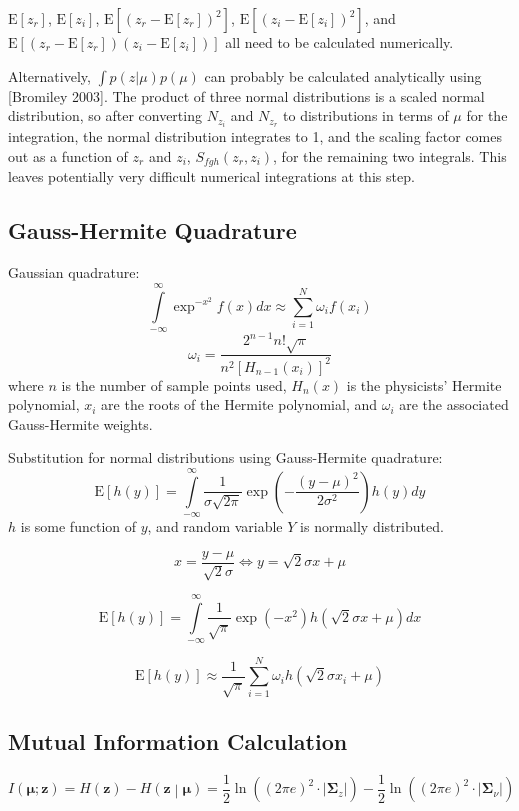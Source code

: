 \documentclass{article}         %
\theoremstyle{definition}
\theoremstyle{remark}
\newcommand{\eq}[1]{\begin{equation} #1 \end{equation}}
\newcommand{\zbf}{\mathbf{z}}
\newcommand{\mubf}{\boldsymbol{\mu}}
\newcommand{\Sigmabf}{\boldsymbol{\Sigma}}
\newcommand{\paren}[1]{\left(#1\right)}
\newcommand{\bracket}[1]{\left[#1\right]}
\newcommand{\expect}[1]{\mathrm{E}\left[#1\right]}
\newcommand{\intinfty}{\int\limits_{-\infty}^\infty}
\newcommand{\sumin}{\sum\limits_{i=1}^N}
\begin{document}
$\expect{z_r}$, $\expect{z_i}$, $\expect{\left(z_r - \expect{z_r}\right)^2}$, $\expect{\left(z_i - \expect{z_i}\right)^2}$, and $\expect{\left(z_r - \expect{z_r}\right)\left(z_i - \expect{z_i}\right)}$ all need to be calculated numerically.
 
Alternatively, $\int p(z|\mu)p(\mu)$ can probably be calculated analytically using [Bromiley 2003]. The product of three normal distributions is a scaled normal distribution, so after converting $N_{z_i}$ and $N_{z_r}$ to distributions in terms of $\mu$ for the integration, the normal distribution integrates to 1, and the scaling factor comes out as a function of $z_r$ and $z_i$, $S_{fgh}\paren{z_r,z_i}$, for the remaining two integrals. This leaves potentially very difficult numerical integrations at this step.

\subsection{Gauss-Hermite Quadrature}

Gaussian quadrature:
\eq{\intinfty\exp^{-x^2}f\paren{x}dx \approx \sumin\omega_if\paren{x_i}}
\eq{\omega_i = \frac{2^{n-1}n!\sqrt{\pi}}{n^2\bracket{H_{n-1}\paren{x_i}}^2}}
where $n$ is the number of sample points used, $H_n\paren{x}$ is the physicists' Hermite polynomial, $x_i$ are the roots of the Hermite polynomial, and $\omega_i$ are the associated Gauss-Hermite weights.

Substitution for normal distributions using Gauss-Hermite quadrature:
\eq{\expect{h\paren{y}} = \intinfty\frac{1}{\sigma\sqrt{2\pi}}\exp\paren{-\frac{\paren{y-\mu}^2}{2\sigma^2}}h\paren{y}dy}
$h$ is some function of $y$, and random variable $Y$ is normally distributed.

\eq{x = \frac{y-\mu}{\sqrt{2}\sigma} \Leftrightarrow y = \sqrt{2}\sigma x+\mu}

\eq{\expect{h\paren{y}} = \intinfty\frac{1}{\sqrt{\pi}}\exp\paren{-x^2}h\paren{\sqrt{2}\sigma x+\mu}dx}

\eq{\expect{h\paren{y}} \approx \frac{1}{\sqrt{\pi}}\sumin\omega_i h\paren{\sqrt{2}\sigma x_i+\mu}}

\subsection{Mutual Information Calculation}

\eq{I\left(\mubf;\zbf\right) = H\left(\zbf\right) - H\left(\zbf\middle|\mubf\right) = \frac{1}{2}\ln\left(\left(2\pi e\right)^2\cdot\lvert\Sigmabf_z\rvert\right) - \frac{1}{2}\ln\left(\left(2\pi e\right)^2\cdot\lvert\Sigmabf_\nu\rvert\right)}
\end{document}
